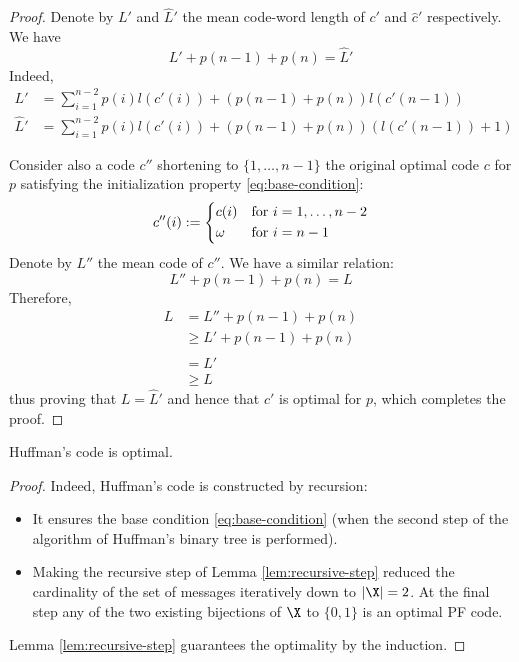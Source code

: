 \documentclass[toc, titlepaged]{../cs-classes/cs-classes}
\begin{document}
\begin{proof}
    Denote by $L'$ and $\hat{L}'$ the mean code-word length of $c'$ and $\hat{c}'$ respectively. We have
    \begin{equation*}
        L'+p(n-1)+p(n)=\hat{L}'
    \end{equation*}
    Indeed,
    \begin{equation*}
        \begin{aligned}
            L'&=\sum_{i=1}^{n-2}p(i)l(c'(i))+(p(n-1)+p(n))l(c'(n-1))\\
            \hat{L}'&=\sum_{i=1}^{n-2} p(i)l(c'(i))+(p(n-1)+p(n))(l(c'(n-1))+1)
        \end{aligned}
    \end{equation*}

    Consider also a code $c''$ shortening to $\{1, \dots, n-1\}$ the original optimal code $c$ for $p$ satisfying the initialization property \eqref{eq:base-condition}:
    \begin{equation}
        \label{eq:c-second}
        c''(i):=\begin{cases*}
            c(i) & for $i=1, \dots, n-2$\\
            \omega & for $i=n-1$
        \end{cases*}
    \end{equation}
    Denote by $L''$ the mean code of $c''$. We have a similar relation:
    \begin{equation*}
        L''+p(n-1)+p(n)=L
    \end{equation*}
    Therefore,
    \begin{equation*}
        \begin{aligned}
            L&=L''+p(n-1)+p(n)\\
            &\geq L' + p(n-1) + p(n)\\
            &=\hat{L}'\\
            &\geq L
        \end{aligned}
    \end{equation*}
    thus proving that $L=\hat{L}'$ and hence that $\hat{c}'$ is optimal for $p$, which completes the proof.
\end{proof}

\begin{corollary}
    Huffman's code is optimal.
\end{corollary}

\begin{proof}
    Indeed, Huffman's code is constructed by recursion:
    \begin{itemize}
        \item It ensures the base condition \eqref{eq:base-condition} (when the second step of the algorithm of Huffman's binary tree is performed).
        \item Making the recursive step of Lemma \ref{lem:recursive-step} reduced the cardinality of the set of messages iteratively down to $|\X|=2$. At the final step any of the two existing bijections of $\X$ to $\{0, 1\}$ is an optimal PF code.
    \end{itemize}
    Lemma \ref{lem:recursive-step} guarantees the optimality by the induction.
\end{proof}
\end{document}
